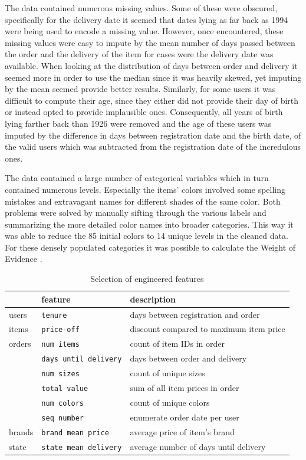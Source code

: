 The data contained numerous missing values. Some of these were obscured, specifically for the delivery date it seemed that dates lying as far back as 1994 were being used to encode a missing value. However, once encountered, these missing values were easy to impute by the mean number of days passed between the order and the delivery of the item for cases were the delivery date was available. When looking at the distribution of days between order and delivery it seemed more in order to use the median since it was heavily skewed, yet imputing by the mean seemed provide better results. Similarly, for some users it was difficult to compute their age, since they either did not provide their day of birth or instead opted to provide implausible ones. Consequently, all years of birth lying farther back than 1926 were removed and the age of these users was imputed by the difference in days between registration date and the birth date, of the valid users which was subtracted from the registration date of the incredulous ones.

The data contained a large number of categorical variables which in turn contained numerous levels. Especially the items' colors involved some spelling mistakes and extravagant names for different shades of the same color. Both problems were solved by manually sifting through the various labels and summarizing the more detailed color names into broader categories. This way it was able to reduce the 85 initial colors to 14 unique levels in the cleaned data. For these densely populated categories it was possible to calculate the Weight of Evidence \cite{woe}.

\begin{table}
\caption{Selection of engineered features}
\label{features-tab}
\begin{tabular}{@{}lll@{}}
       & feature             & description                           \\ \midrule
users  & \texttt{tenure}              & days between registration and order        \\
items  & \texttt{price-off}           & discount compared to maximum item price    \\
orders & \texttt{num items}           & count of item IDs in order                 \\
       & \texttt{days until delivery} & days between order and delivery            \\
       & \texttt{num sizes}           & count of unique sizes                      \\
       & \texttt{total value}         & sum of all item prices in order            \\
       & \texttt{num colors}          & count of unique colors                     \\
       & \texttt{seq number}          & enumerate order date per user              \\
brands & \texttt{brand mean price}    & average price of item's brand              \\
state  & \texttt{state mean delivery} & average number of days until delivery
\end{tabular}
\end{table}

